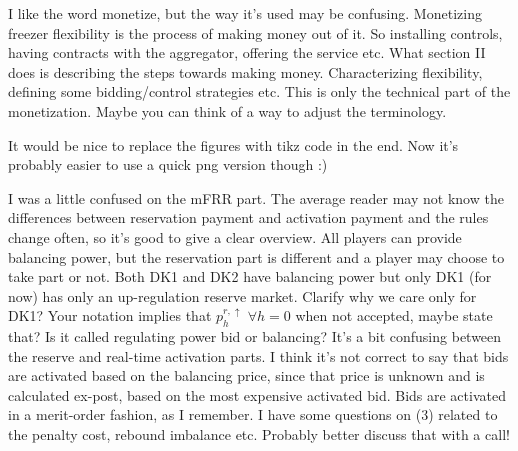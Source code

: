 I like the word monetize, but the way it's used may be confusing. Monetizing freezer flexibility is the process of making money out of it. So installing controls, having contracts with the aggregator, offering the service etc. What section II does is describing the steps towards making money. Characterizing flexibility, defining some bidding/control strategies etc. This is only the technical part of the monetization. Maybe you can think of a way to adjust the terminology.

It would be nice to replace the figures with tikz code in the end. Now it's probably easier to use a quick png version though :)

I was a little confused on the mFRR part. The average reader may not know the differences between reservation payment and activation payment and the rules change often, so it's good to give a clear overview.
All players can provide balancing power, but the reservation part is different and a player may choose to take part or not. Both DK1 and DK2 have balancing power but only DK1 (for now) has only an up-regulation reserve market.
Clarify why we care only for DK1?
Your notation implies that $p_{h}^{r,\uparrow}$ $\forall{h} = 0$ when not accepted, maybe state that?
Is it called regulating power bid or balancing? It's a bit confusing between the reserve and real-time activation parts. 
I think it's not correct to say that bids are activated based on the balancing price, since that price is unknown and is calculated ex-post, based on the most expensive activated bid.
Bids are activated in a merit-order fashion, as I remember.
I have some questions on (3) related to the penalty cost, rebound imbalance etc. 
Probably better discuss that with a call!